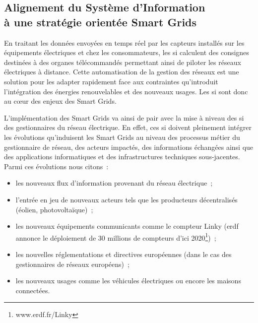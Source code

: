 
\subsection{Alignement du Système d'Information\\à une stratégie orientée Smart Grids}


En traitant les données envoyées en temps réel par les capteurs installés sur 
les équipements électriques et chez les consommateurs, les \gls{si} calculent 
des consignes destinées à des organes télécommandés permettant ainsi de piloter 
les 
réseaux électriques à distance. 
Cette automatisation de la gestion des réseaux est une solution pour les adapter 
rapidement face aux contraintes qu'introduit l'intégration des énergies 
renouvelables et des nouveaux usages\cite{cre}. Les \gls{si} sont donc au cœur 
des 
enjeux des Smart Grids.  

L'implémentation des Smart Grids va ainsi de pair avec la mise à niveau des 
\gls{si} des gestionnaires du réseau électrique. En effet, ces \gls{si} doivent 
pleinement intégrer les évolutions qu'induisent les Smart Grids au niveau des 
processus 
métier du gestionnaire de réseau, des acteurs impactés, des informations 
échangées ainsi que des applications informatiques et des infrastructures 
techniques sous-jacentes. Parmi ces évolutions nous citons~:

\begin{itemize}
    \item les nouveaux flux d'information provenant du réseau électrique~;

    \item l'entrée en jeu de nouveaux acteurs tels que les producteurs
    décentralisés (éolien, photovoltaïque)~;

    \item les nouveaux équipements communicants comme le compteur Linky 
(\gls{erdf} 
    annonce le déploiement de 30 millions de compteurs d'ici 
    2020\footnote{www.erdf.fr/Linky})~;

    \item les nouvelles réglementations et directives européennes (dans le cas 
    des gestionnaires de réseaux européens)~;

    \item les nouveaux usages comme les véhicules électriques ou encore les 
    maisons connectées.
\end{itemize}

